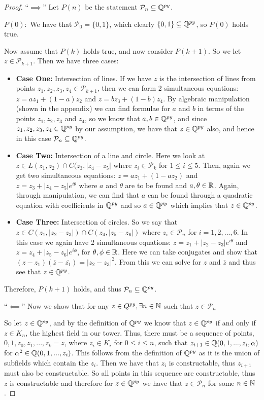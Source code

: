 \begin{proof}
    ``$\implies$'' Let $P(n)$ be the statement $\mathcal{P}_n \subseteq \mathbb Q^{py}$.

    $P(0):$ We have that $\mathcal{P}_0 = \{0,1\}$, which clearly $\{0,1\}\subseteq\mathbb Q^{py}$, so $P(0)$ holds true.

    Now assume that $P(k)$ holds true, and now consider $P(k+1)$. So we let $z \in \mathcal{P}_{k+1}$. Then we have three cases:
    \begin{itemize}
        \item \textbf{Case One:} Intersection of lines. If we have $z$ is the intersection of lines from points $z_1, z_2, z_3, z_4 \in \mathcal{P}_{k+1}$, then we can form 2 simultaneous equations:
        $z = az_1+(1-a)z_2$ and $z = bz_3+(1-b)z_4$. By algebraic manipulation (shown in the appendix) we can find formulae for $a$ and $b$ in terms of the points $z_1,z_2,z_3$ and $z_4$, so we know that $a,b \in \mathbb Q^{py}$, and since $z_1,z_2,z_3,z_4\in \mathbb Q^{py}$ by our assumption, we have that $z\in \mathbb Q^{py}$ also, and hence in this case $\mathcal{P}_n \subseteq \mathbb Q^{py}$.
        \item \textbf{Case Two:} Intersection of a line and circle. Here we look at $z \in L(z_1,z_2)\cap C(z_3,|z_4-z_5|$ where $z_i \in \mathcal{P}_k$ for $1\leq i \leq 5$. Then, again we get two simultaneous equations:
        $z=az_1+(1-az_2)$ and $z=z_3+|z_4-z_5|e^{i\theta}$ where $a$ and $\theta$ are to be found and $a,\theta \in \mathbb R$. Again, through manipulation, we can find that $a$ can be found through a quadratic equation with coefficients in $\mathbb Q^{py}$ and so $a \in \mathbb Q^{py}$ which implies that $z\in \mathbb Q^{py}$.
        \item \textbf{Case Three:} Intersection of circles. So we say that $z \in C(z_1,|z_2-z_3|) \cap C(z_4,|z_5-z_6|)$ where $z_i \in \mathcal{P}_n$ for $i = 1,2,...,6$. In this case we again have 2 simultaneous equations: $z=z_1+|z_2-z_3|e^{i\theta}$ and $z=z_4+|z_5-z_6|e^{i\phi}$, for $\theta,\phi \in \mathbb R$. Here we can take conjugates and show that $(z-z_1)(\overline{z}-\overline{z_1})=|z_2-z_3|^2$. From this we can solve for $z$ and $\overline{z}$ and thus see that $z \in \mathbb Q^{py}$.
    \end{itemize}
Therefore, $P(k+1)$ holds, and thus $\mathcal{P}_n \subseteq \mathbb Q^{py}$. 

``$\impliedby$'' Now we show that for any $z \in Q^{py}, \exists n \in \mathbb N$ such that $z \in \mathcal{P}_n$

So let $z \in \mathbb Q^{py}$, and by the definition of $\mathbb Q^{py}$ we know that  $z\in \mathbb Q^{py}$ if and only if $z \in K_n$, the highest field in our tower. Thus, there must be a sequence of points, $0,1,z_0,z_1,...,z_k=z$, where $z_i \in K_i$ for $0\leq i \leq n$, such that $z_{i+1} \in \mathbb Q(0,1,...,z_i,\alpha)$ for $\alpha^2 \in \mathbb Q(0,1,...,z_i)$. This follows from the definition of $\mathbb Q^{py}$ as it is the union of subfields which contain the $z_i$. Then we have that $z_i$ is constructable, thus $z_{i+1}$ must also be constructable. So all points in this sequence are constructable, thus $z$ is constructable and therefore for $z \in \mathbb Q^{py}$ we have that $z \in \mathcal{P}_n$ for some $n \in \mathbb N$.


\end{proof}
